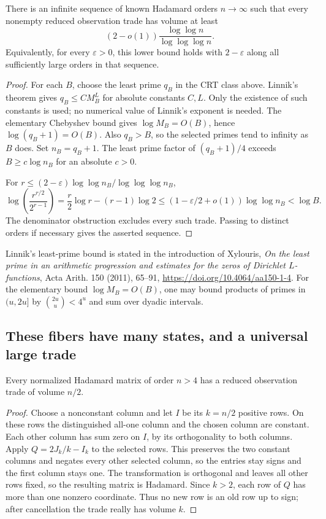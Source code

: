 \begin{corollary}\label{trd:linnik}
There is an infinite sequence of known Hadamard orders $n\to\infty$
such that every nonempty reduced observation trade has volume at least
\[
 (2-o(1))\frac{\log\log n}{\log\log\log n}.
\]
Equivalently, for every $\varepsilon>0$, this lower bound holds with
$2-\varepsilon$ along all sufficiently large orders in that sequence.
\end{corollary}
\begin{proof}
For each $B$, choose the least prime $q_B$ in the CRT class above.
Linnik's theorem gives $q_B\le C M_B^L$ for absolute constants $C,L$.
Only the existence of such constants is used; no numerical value of
Linnik's exponent is needed. The elementary Chebyshev bound gives
$\log M_B=O(B)$, hence $\log(q_B+1)=O(B)$.
Also $q_B>B$, so the selected primes tend to infinity as $B$ does.
Set $n_B=q_B+1$. The least prime factor of $(q_B+1)/4$ exceeds
$B\ge c\log n_B$ for an absolute $c>0$.

For $r\le(2-\varepsilon)\log\log n_B/\log\log\log n_B$,
\[
 \log\!\left(\frac{r^{r/2}}{2^{r-1}}\right)
 =\frac r2\log r-(r-1)\log2
 \le(1-\varepsilon/2+o(1))\log\log n_B
 <\log B.
\]
The denominator obstruction excludes every such trade. Passing to
distinct orders if necessary gives the asserted sequence.
\end{proof}
Linnik's least-prime bound is stated in the introduction of Xylouris,
\emph{On the least prime in an arithmetic progression and estimates for
the zeros of Dirichlet $L$-functions}, Acta Arith. 150 (2011), 65--91,
\url{https://doi.org/10.4064/aa150-1-4}. For the elementary bound
$\log M_B=O(B)$, one may bound products of primes in $(u,2u]$ by
$\binom{2u}{u}<4^u$ and sum over dyadic intervals.

\subsection{These fibers have many states, and a universal large trade}
\begin{proposition}
Every normalized Hadamard matrix of order $n>4$ has a reduced
observation trade of volume $n/2$.
\end{proposition}
\begin{proof}
Choose a nonconstant column and let $I$ be its $k=n/2$ positive rows.
On these rows the distinguished all-one column and the chosen column
are constant. Each other column has sum zero on $I$, by its
orthogonality to both columns. Apply $Q=2J_k/k-I_k$ to the selected
rows. This preserves the two constant columns and negates every other
selected column, so the entries stay signs and the first column stays
one. The transformation is orthogonal and leaves all other rows fixed,
so the resulting matrix is Hadamard. Since $k>2$, each row of $Q$
has more than one nonzero coordinate. Thus no new row is an old row
up to sign; after cancellation the trade really has volume $k$.
\end{proof}

